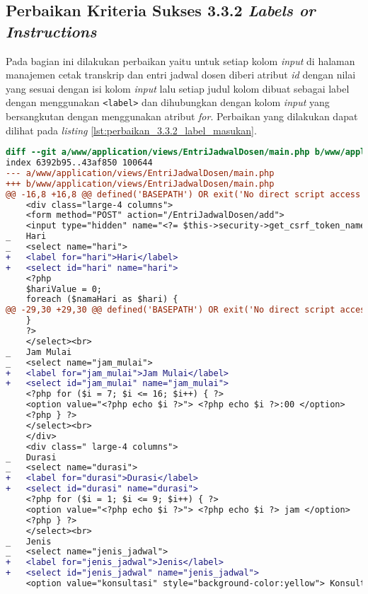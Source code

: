 \subsection{Perbaikan Kriteria Sukses 3.3.2 \textit{Labels or Instructions}}
\label{subsec:perbaikan_kriteria_sukses_3.3.2}
Pada bagian ini dilakukan perbaikan yaitu untuk setiap kolom \textit{input} di halaman manajemen cetak transkrip dan entri jadwal dosen diberi atribut \textit{id} dengan nilai yang sesuai dengan isi kolom \textit{input} lalu setiap judul kolom dibuat sebagai label dengan menggunakan \texttt{<label>} dan dihubungkan dengan kolom \textit{input} yang bersangkutan dengan menggunakan atribut \textit{for}. Perbaikan yang dilakukan dapat dilihat pada \textit{listing} \ref{lst:perbaikan_3.3.2_label_masukan}.

\begin{lstlisting}[frame=single, label={lst:perbaikan_3.3.2_label_masukan}, language=diff, caption=Perbaikan Kriteria Sukses 3.3.2]
diff --git a/www/application/views/EntriJadwalDosen/main.php b/www/application/views/EntriJadwalDosen/main.php
index 6392b95..43af850 100644
--- a/www/application/views/EntriJadwalDosen/main.php
+++ b/www/application/views/EntriJadwalDosen/main.php
@@ -16,8 +16,8 @@ defined('BASEPATH') OR exit('No direct script access allowed');
    <div class="large-4 columns">
    <form method="POST" action="/EntriJadwalDosen/add">
    <input type="hidden" name="<?= $this->security->get_csrf_token_name() ?>" value="<?= $this->security->get_csrf_hash() ?>" />
_   Hari
_   <select name="hari"> 
+   <label for="hari">Hari</label>
+   <select id="hari" name="hari"> 
    <?php
    $hariValue = 0;
    foreach ($namaHari as $hari) {
@@ -29,30 +29,30 @@ defined('BASEPATH') OR exit('No direct script access allowed');
    }
    ?>
    </select><br>
_   Jam Mulai
_   <select name="jam_mulai"> 
+   <label for="jam_mulai">Jam Mulai</label>
+   <select id="jam_mulai" name="jam_mulai">  
    <?php for ($i = 7; $i <= 16; $i++) { ?>
    <option value="<?php echo $i ?>"> <?php echo $i ?>:00 </option>
    <?php } ?>
    </select><br>
    </div>
    <div class=" large-4 columns">
_   Durasi
_   <select name="durasi"> 
+   <label for="durasi">Durasi</label>
+   <select id="durasi" name="durasi">  
    <?php for ($i = 1; $i <= 9; $i++) { ?>
    <option value="<?php echo $i ?>"> <?php echo $i ?> jam </option>
    <?php } ?>
    </select><br>
_   Jenis  
_   <select name="jenis_jadwal"> 
+   <label for="jenis_jadwal">Jenis</label>
+   <select id="jenis_jadwal" name="jenis_jadwal">  
    <option value="konsultasi" style="background-color:yellow"> Konsultasi </option>

\end{lstlisting}
